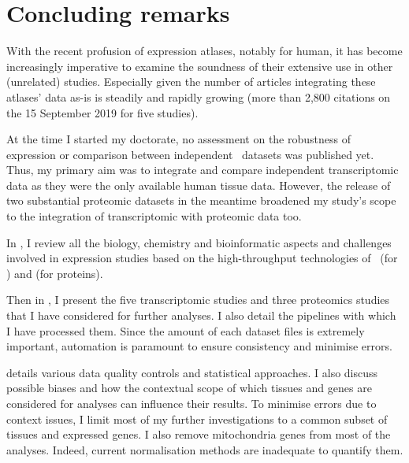 \chapter{Concluding remarks}\label{ch:conclusion}

\setlength{\epigraphwidth}{0.49\textwidth}%
    \setlength{\epigraphrule}{0pt}%


With the recent profusion of expression atlases,
notably for human,
it has become increasingly imperative to examine
the soundness of their extensive use in other (unrelated) studies.
Especially given the number of articles integrating
these atlases' data as-is is steadily and rapidly growing
(more than 2,800 citations on the 15 September 2019 for five studies).

At the time I started my doctorate,
no assessment on the robustness of expression or
comparison between independent \Rnaseq\ datasets was published yet.
Thus,
my primary aim was to integrate and compare independent transcriptomic data
as they were the only available human tissue data.
However, the release of two substantial proteomic datasets in the meantime
broadened my study's scope
to the integration of transcriptomic with proteomic data too.

In ,
I review all the biology, chemistry and bioinformatic aspects and challenges
involved in expression studies based on the high-throughput technologies
of \Rnaseq\ (for \mRNAs) and \ms{} (for proteins).

Then in ,
I present the five transcriptomic studies and three proteomics studies
that I have considered for further analyses.
I also detail the pipelines with which I have processed them.
Since the amount of each dataset files is extremely important,
automation is paramount to ensure consistency and minimise errors.\mybr\

 details various data quality controls
and statistical approaches.
I also discuss possible biases and
how the contextual scope of which tissues and genes are considered for analyses
can influence their results.
To minimise errors due to context issues,
I limit most of my further investigations to
a common subset of tissues and expressed genes.
I also remove mitochondria genes from most of the analyses.
Indeed, current normalisation methods are inadequate to quantify them.


